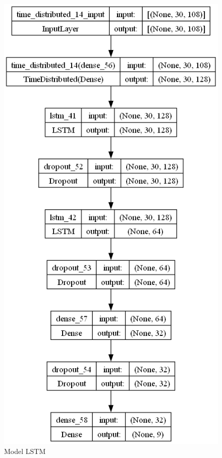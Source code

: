 \begin{figure}[H]
  \centering

  \includegraphics[scale=0.5]{gambar/bab4-uji-model-best-model.png}

  \caption{Model LSTM}
  \label{fig:modelLSTM}
\end{figure}

